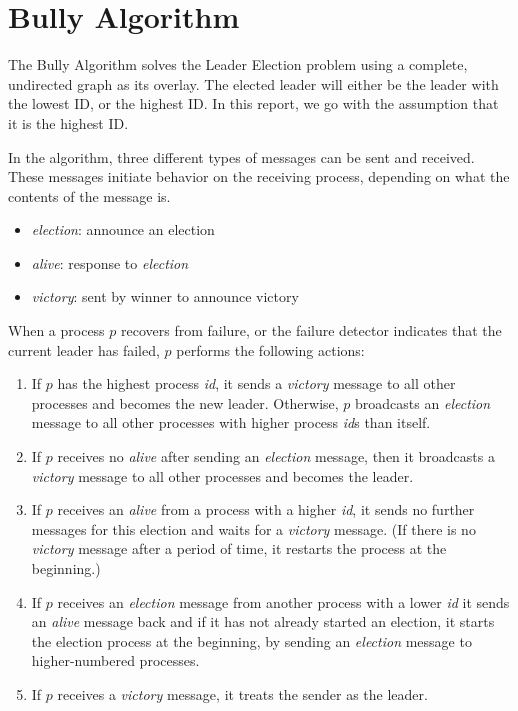 \documentclass{report}
\begin{document}
\section{Bully Algorithm}

The Bully Algorithm solves the Leader Election problem using a complete, undirected graph as its overlay. The elected leader will either be the leader with the lowest ID, or the highest ID. In this report, we go with the assumption that it is the highest ID.

In the algorithm, three different types of messages can be sent and received. These messages initiate behavior on the receiving process, depending on what the contents of the message is.
\begin{itemize}
  \item \textit{election}: announce an election
  \item \textit{alive}: response to \textit{election}
  \item \textit{victory}: sent by winner to announce victory
\end{itemize}

When a process $p$ recovers from failure, or the failure detector indicates that the current leader has failed, $p$ performs the following actions:

\begin{enumerate}
\item If $p$ has the highest process \textit{id}, it sends a \textit{victory} message to all other processes and becomes the new leader. Otherwise, $p$ broadcasts an \textit{election} message to all other processes with higher process \textit{id}s than itself.
\item If $p$ receives no \textit{alive} after sending an \textit{election} message, then it broadcasts a \textit{victory} message to all other processes and becomes the leader.
\item If $p$ receives an \textit{alive} from a process with a higher \textit{id}, it sends no further messages for this election and waits for a \textit{victory} message. (If there is no \textit{victory} message after a period of time, it restarts the process at the beginning.)
\item If $p$ receives an \textit{election} message from another process with a lower \textit{id} it sends an \textit{alive} message back and if it has not already started an election, it starts the election process at the beginning, by sending an \textit{election} message to higher-numbered processes.
\item If $p$ receives a \textit{victory} message, it treats the sender as the leader.
\end{enumerate}
\end{document}
